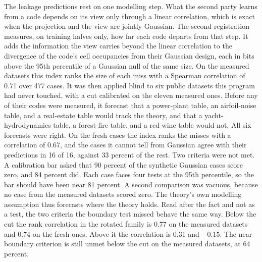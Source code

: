 \documentclass[11pt]{article}
\begin{document}
The leakage predictions rest on one modelling step. What the second
party learns from a code depends on its view only through a linear
correlation, which is exact when the projection and the view are jointly
Gaussian. The second registration measures, on training halves only,
how far each code departs from that step. It adds the information the
view carries beyond the linear correlation to the divergence of the
code's cell occupancies from their Gaussian design, each in bits above
the 95th percentile of a Gaussian null of the same size. On the measured
datasets this index ranks the size of each miss with a Spearman
correlation of 0.71 over 477 cases. It was then applied blind to six
public datasets this program had never touched, with a cut calibrated on
the eleven measured ones. Before any of their codes were measured, it
forecast that a power-plant table, an airfoil-noise table, and a
real-estate table would track the theory, and that a yacht-hydrodynamics
table, a forest-fire table, and a red-wine table would not. All six
forecasts were right. On the fresh cases the index ranks the misses with
a correlation of 0.67, and the cases it cannot tell from Gaussian agree
with their predictions in 16 of 16, against 33 percent of the rest. Two
criteria were not met. A calibration bar asked that 90 percent of the
synthetic Gaussian cases score zero, and 84 percent did. Each case faces
four tests at the 95th percentile, so the bar should have been near 81
percent. A second comparison was vacuous, because no case from the
measured datasets scored zero. The theory's own modelling assumption
thus forecasts where the theory holds. Read after the fact and not as a
test, the two criteria the boundary test missed behave the same way.
Below the cut the rank correlation in the rotated family is 0.77 on the
measured datasets and 0.74 on the fresh ones. Above it the correlation is
0.31 and $-0.15$. The near-boundary criterion is still unmet below the cut on the
measured datasets, at 64 percent.
\end{document}
